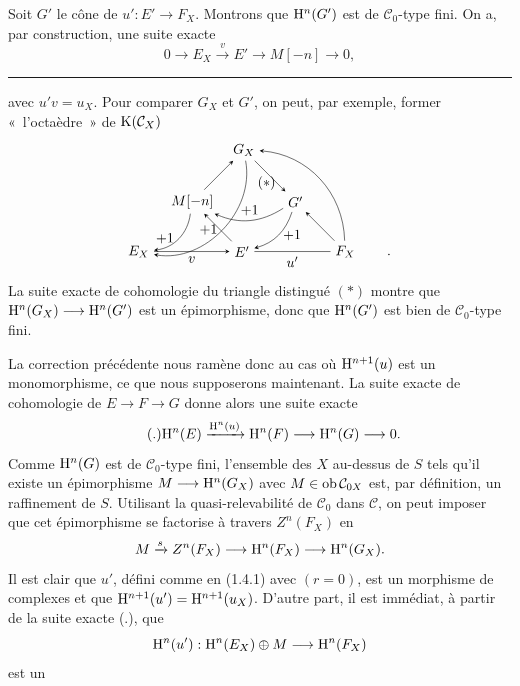 \documentclass[11pt]{article}
\begin{document}
Soit \(G'\) le cône de \(u':E'\to F_X\). Montrons que \(\mathrm H^n(G')\) est de \(\mathcal C_0\)-type fini. On a, par construction, une suite exacte
\[
  0\longrightarrow E_X\xrightarrow{v}E'\longrightarrow M[-n]\longrightarrow 0,
\]


\medskip\hrule\medskip

avec \(u'v=u_X\). Pour comparer \(G_X\) et \(G'\), on peut, par exemple, former «~l'octaèdre~» de \(\mathrm K(\mathcal C_X)\)
\[
\begin{tikzpicture}[>=stealth,baseline=(GX.base),node distance=1.0cm]
  \node (EX) at (0,0) {$E_X$};
  \node (Ep) at (2.6,0) {$E'$};
  \node (FX) at (5.2,0) {$F_X$};
  \node (M)  at (1.35,1.25) {$M[-n]$};
  \node (GX) at (2.65,2.55) {$G_X$};
  \node (Gp) at (3.95,1.25) {$G'$};
  \node at (3.22,1.72) {$(*)$};
  \draw[->] (EX) -- node[below] {$v$} (Ep);
  \draw (Ep) -- node[below] {$u'$} (FX);
  \draw[->] (Ep) -- (M);
  \draw[->] (M) -- (GX);
  \draw[->] (GX) -- (Gp);
  \draw[->] (FX) -- (Gp);
  \draw[->] (M) to[bend left=38] node[left] {$+1$} (EX);
  \draw[->] (Gp) to[bend left=28] node[above] {$+1$} (M);
  \draw[->] (Gp) to[bend left=28] node[right] {$+1$} (Ep);
  \draw[->] (GX) to[bend left=55] node[left] {$+1$} (EX);
  \draw[->] (FX) to[bend right=42] (GX);
  \node[anchor=base] at (6.3,0 |- FX.base) {.};
\end{tikzpicture}
\]
La suite exacte de cohomologie du triangle distingué \((*)\) montre que \(\mathrm H^n(G_X)\longrightarrow \mathrm H^n(G')\) est un épimorphisme, donc que \(\mathrm H^n(G')\) est bien de \(\mathcal C_0\)-type fini.

La correction précédente nous ramène donc au cas où \(\mathrm H^{n+1}(u)\) est un monomorphisme, ce que nous supposerons maintenant. La suite exacte de cohomologie de \(E\to F\to G\) donne alors une suite exacte
\begin{equation}\tag{.}
  \mathrm H^n(E)\xrightarrow{\mathrm H^n(u)}
  \mathrm H^n(F)\longrightarrow \mathrm H^n(G)\longrightarrow 0.
\end{equation}
Comme \(\mathrm H^n(G)\) est de \(\mathcal C_0\)-type fini, l'ensemble des \(X\) au-dessus de \(S\) tels qu'il existe un épimorphisme \(M\longrightarrow \mathrm H^n(G_X)\) avec \(M\in\operatorname{ob}\mathcal C_{0X}\) est, par définition, un raffinement de \(S\). Utilisant la quasi-relevabilité de \(\mathcal C_0\) dans \(\mathcal C\), on peut imposer que cet épimorphisme se factorise à travers \(Z^n(F_X)\) en
\[
  M\xrightarrow{s}Z^n(F_X)\longrightarrow \mathrm H^n(F_X)\longrightarrow \mathrm H^n(G_X).
\]
Il est clair que \(u'\), défini comme en (1.4.1) avec \((r=0)\), est un morphisme de complexes et que \(\mathrm H^{n+1}(u')=\mathrm H^{n+1}(u_X)\). D'autre part, il est immédiat, à partir de la suite exacte (.), que
\[
  \mathrm H^n(u'):\mathrm H^n(E_X)\oplus M\longrightarrow \mathrm H^n(F_X)
\]
est un
\end{document}
